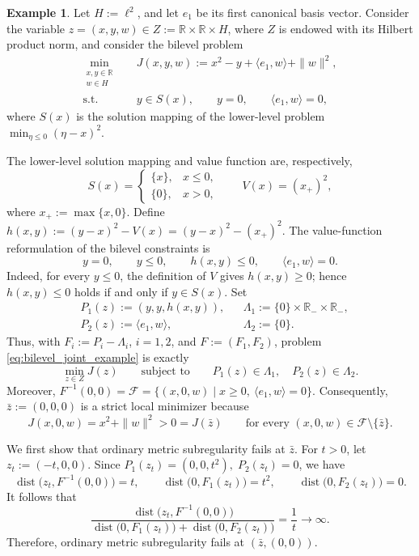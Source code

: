 \documentclass[12pt,twoside,reqno]{amsart}
\theoremstyle{definition}
\newtheorem{example}[theorem]{Example}
\numberwithin{equation}{section}
\begin{document}
\begin{example}\label{ex:bilevel_finite_directional_mscq}
Let \(H:=\ell^2\), and let \(e_1\) be its first canonical basis
vector. Consider the variable
\(z=(x,y,w)\in Z:=\mathbb R\times\mathbb R\times H\), where \(Z\) is
endowed with its Hilbert product norm, and consider the bilevel problem
\begin{equation}\label{eq:bilevel_joint_example}
    \begin{aligned}
        \min_{\substack{x,y\in\mathbb R\\w\in H}}\quad
        &J(x,y,w):=x^2-y+\langle e_1,w\rangle+\|w\|^2,\\
        \text{s.t.}\quad
        &y\in S(x),\qquad y=0,\qquad \langle e_1,w\rangle=0,
    \end{aligned}
\end{equation}
where \(S(x)\) is the solution mapping of the lower-level problem $\min_{\eta\leq0}(\eta-x)^2$. 

The lower-level solution mapping and value function are, respectively,
\[
    S(x)=
    \begin{cases}
        \{x\}, & x\leq0,\\
        \{0\}, & x>0,
    \end{cases}
    \qquad
    V(x)=(x_+)^2,
\]
where \(x_+:=\max\{x,0\}\). Define $h(x,y):=(y-x)^2-V(x)=(y-x)^2-(x_+)^2$. The value-function reformulation of the bilevel constraints is
\[
    y=0,\qquad y\leq0,\qquad h(x,y)\leq0,\qquad
    \langle e_1,w\rangle=0.
\]
Indeed, for every \(y\leq0\), the definition of \(V\) gives
\(h(x,y)\geq0\); hence \(h(x,y)\leq0\) holds if and only if
\(y\in S(x)\). Set
\[
    \begin{aligned}
        &P_1(z):=(y,y,h(x,y)),
        &&\Lambda_1:=\{0\}\times\mathbb R_-\times\mathbb R_-,\\
        &P_2(z):=\langle e_1,w\rangle,
        &&\Lambda_2:=\{0\}.
    \end{aligned}
\]
Thus, with \(F_i:=P_i-\Lambda_i\), \(i=1,2\), and
\(F:=(F_1,F_2)\), problem \eqref{eq:bilevel_joint_example} is exactly
\[
    \min_{z\in Z}J(z)
    \qquad\text{subject to}\qquad
    P_1(z)\in\Lambda_1,\quad P_2(z)\in\Lambda_2.
\]
Moreover, $F^{-1}(0,0)=\mathcal F=\{(x,0,w)\mid x\geq0,\ \langle e_1,w\rangle=0\}$. Consequently, \(\bar{z}:=(0,0,0)\) is a strict local minimizer because
\[
    J(x,0,w)=x^2+\|w\|^2>0=J(\bar{z})
    \qquad\text{for every }(x,0,w)\in\mathcal F\setminus\{\bar{z}\}.
\]

We first show that ordinary metric subregularity fails at \(\bar{z}\). For
\(t>0\), let \(z_t:=(-t,0,0)\). Since $P_1(z_t)=(0,0,t^2),\; P_2(z_t)=0$, we have
\[
    \operatorname{dist}\bigl(z_t,F^{-1}(0,0)\bigr)=t,
    \qquad
    \operatorname{dist}\bigl(0,F_1(z_t)\bigr)=t^2,
    \qquad
    \operatorname{dist}\bigl(0,F_2(z_t)\bigr)=0.
\]
It follows that
\[
    \frac{\operatorname{dist}\bigl(z_t,F^{-1}(0,0)\bigr)}
    {\operatorname{dist}\bigl(0,F_1(z_t)\bigr)
     +\operatorname{dist}\bigl(0,F_2(z_t)\bigr)}
    =\frac1t\longrightarrow\infty.
\]
Therefore, ordinary metric subregularity fails at \((\bar{z},(0,0))\).


\end{example}
\end{document}
